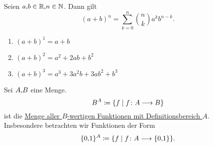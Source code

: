 \documentclass[../ana1.tex]{subfiles}
\begin{document}
\begin{satz} Seien \(a \text{,} b \in \mathbb{R} \text{,} n \in \mathbb{N} \). Dann gilt
	\[{(a+b)}^n = \sum_{k=0}^{n} \binom{n}{k} a^k b^{n-k}. \]
\end{satz}
\begin{bew}
\end{bew}

\begin{bspe}\leavevmode
	\begin{enumerate}[(1)]
		\item \({(a+b)}^1 = a+b \)
		\item \({(a+b)}^2 = a^2 + 2ab + b^2 \)
		\item \({(a+b)}^3 = a^3 +3a^2b + 3ab^2 +b^3 \)
	\end{enumerate}
\end{bspe}

\begin{defi*}
	Sei \(A \text{,} B \) eine Menge.
	\[B^A \coloneqq \{f \; \vert \; f \colon A \longrightarrow B \} \]
	ist die \underline{Menge aller \(B\)-wertigen Funktionen mit Definitionsbereich \(A \)}. \\
	Insbesondere betrachten wir Funktionen der Form
	\[\{0 \text{,} 1\}^A \coloneqq \{f \; \vert \; f \colon A \longrightarrow \{0 \text{,} 1\} \}. \]
\end{defi*}
\end{document}
